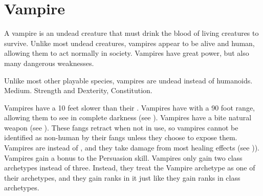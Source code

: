 


\section{Vampire}
A vampire is an undead creature that must drink the blood of living creatures to survive.
Unlike most undead creatures, vampires appear to be alive and human, allowing them to act normally in society.
Vampires have great power, but also many dangerous weaknesses.

 Unlike most other playable species, vampires are undead instead of humanoids.
 Medium.
  Strength and Dexterity,  Constitution.
\begin{itemize}
	 Vampires have a  10 feet slower than their .
	 Vampires have  with a 90 foot range, allowing them to see in complete darkness (see ).
	 Vampires have a bite natural weapon (see ).
	      These fangs retract when not in use, so vampires cannot be identified as non-human by their fangs unless they choose to expose them.
	 Vampires are  instead of , and they take damage from most healing effects (see )).
	 Vampires gain a  bonus to the Persuasion skill.
	 Vampires only gain two class archetypes instead of three.
	      Instead, they treat the Vampire archetype as one of their archetypes, and they gain ranks in it just like they gain ranks in class archetypes.
\end{itemize}

